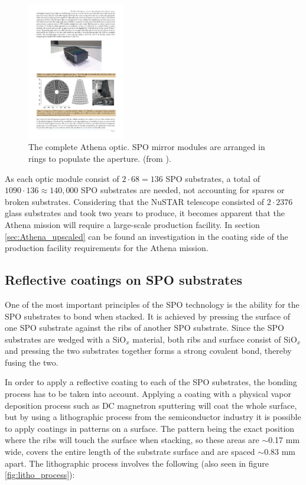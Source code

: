 \begin{figure}[!h]
  \center
  \includegraphics[height=6cm]{figures/athena/athena_full_optic.pdf}
\caption{\footnotesize The complete Athena optic. SPO mirror modules are arranged in rings to populate the aperture. (from \cite{Willingale:2013vo}).}\label{fig:Athena_full_optic}
\end{figure}

As each optic module consist of $2 \cdot 68 = 136$ SPO substrates, a total of $1090 \cdot 136 \approx 140,000$ SPO substrates are needed, not accounting for spares or broken substrates. Considering that the NuSTAR telescope consisted of $2\cdot2376$ glass substrates and took two years to produce, it becomes apparent that the Athena mission will require a large-scale production facility. In section \ref{sec:Athena_upscaled} can be found an investigation in the coating side of the production facility requirements for the Athena mission.

\subsection{Reflective coatings on SPO substrates}
One of the most important principles of the SPO technology is the ability for the SPO substrates to bond when stacked. It is achieved by pressing the surface of one SPO substrate against the ribs of another SPO substrate. Since the SPO substrates are wedged with a SiO$_x$ material, both ribs and surface consist of SiO$_x$ and pressing the two substrates together forms a strong covalent bond, thereby fusing the two.

In order to apply a reflective coating to each of the SPO substrates, the bonding process has to be taken into account. Applying a coating with a physical vapor deposition process such as DC magnetron sputtering will coat the whole surface, but by using a lithographic process from the semiconductor industry it is possible to apply coatings in patterns on a surface. The pattern being the exact position where the ribs will touch the surface when stacking, so these areas are $\sim$0.17 mm wide, covers the entire length of the substrate surface and are spaced $\sim$0.83 mm apart. The lithographic process involves the following (also seen in figure \ref{fig:litho_process}):

